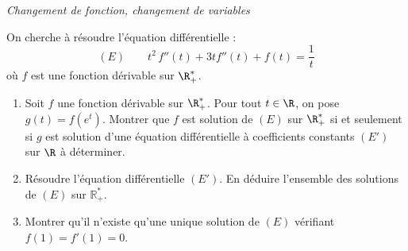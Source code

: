 \documentclass[a4paper,10pt]{report}
\begin{document}

\medskip

\begin{center}
\textit{{ {\large Changement de fonction, changement de variables}}}
\end{center}

\medskip

\begin{Exa} On cherche à résoudre l'équation différentielle :
$$ (E) \qquad t^2\,f''(t) + 3 t f''(t)+f(t)  = \dfrac{1}{t} $$
où $f$ est une fonction dérivable sur $\R_+^*$.
\begin{enumerate}
\item Soit $f$ une fonction dérivable sur $\R_+^*$. Pour tout $t\in \R$, on pose $g(t)=f(e^{t})$. Montrer que $f$ est solution de $(E)$ sur $\R_+^*$ si et seulement si $g$ est solution d'une équation différentielle à coefficients constants $(E')$ sur $\R$ à déterminer.
\item Résoudre l'équation différentielle $(E')$. En déduire l'ensemble des solutions de $(E)$ sur $\mathbb{R}^*_+$.
\item Montrer qu'il n'existe qu'une unique solution de $(E)$ vérifiant $f(1)=f'(1)=0$.
\end{enumerate}
\end{Exa}
\end{document}
